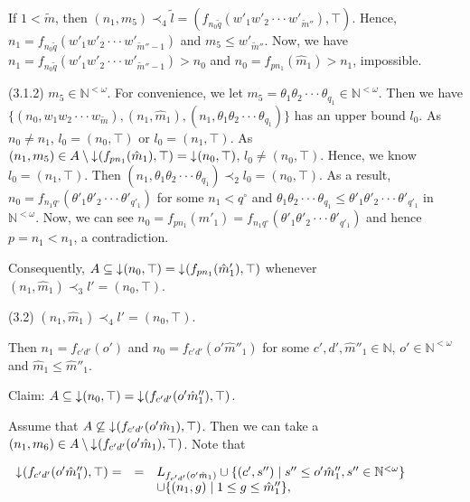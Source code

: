 \documentclass[preprint,12pt]{elsarticle}
\numberwithin{equation}{section}
\newcommand{\dn}{\mathord{\downarrow}\hspace{0.05em}}
\begin{document}
If $1<\widetilde{m}$, then $(n_{1},m_{5})\prec_{4}\widetilde{l}=(f_{n_{0}\widetilde{q}}(w'_{1}w'_{2}\cdot\cdot\cdot w'_{\widetilde{m}''}),\top)$. Hence,  $n_{1}=f_{n_{0}\widetilde{q}}(w'_{1}w'_{2}\cdot\cdot\cdot w'_{\widetilde{m}''-1})$ and $m_{5}\leq w'_{\widetilde{m}''}$. Now, we have $n_{1}=f_{n_{0}\widetilde{q}}(w'_{1}w'_{2}\cdot\cdot\cdot w'_{\widetilde{m}''-1})>n_{0}$ and $n_{0}=f_{pn_{1}}(\hat{m}_{1})>n_{1}$, impossible.




(3.1.2) $m_{5}\in \mathbb{N}^{<\omega}$. For convenience, we let $m_{5}=\theta_{1}\theta_{2}\cdot\cdot\cdot\theta_{q_{1}}\in\mathbb{N}^{<\omega}$. Then we have $\{(n_{0},w_{1}w_{2}\cdot\cdot\cdot w_{\widetilde{m}}),(n_{1},\hat{m}_{1}),(n_{1},\theta_{1}\theta_{2}\cdot\cdot\cdot\theta_{q_{1}})\}$ has an upper bound $l_{0}$. As $n_{0}\neq n_{1}$, $l_{0}=(n_{0},\top)$ or $l_{0}=(n_{1},\top)$. As $(n_{1},m_{5})\in A\setminus\dn(f_{pn_{1}}(\hat{m}_{1}),\top)=\dn(n_{0},\top)$, $l_{0}\neq(n_{0},\top)$. Hence, we know $l_{0}=(n_{1},\top)$. Then $(n_{1},\theta_{1}\theta_{2}\cdot\cdot\cdot\theta_{q_{1}})\prec_{2}l_{0}=(n_{0},\top)$. As a result, $n_{0}=f_{n_{1}q^{\circ}}(\theta'_{1}\theta'_{2}\cdot\cdot\cdot\theta'_{q'_{1}})$ for some $n_{1}<q^{\circ}$ and $\theta_{1}\theta_{2}\cdot\cdot\cdot\theta_{q_{1}}\leq\theta'_{1}\theta'_{2}\cdot\cdot\cdot\theta'_{q'_{1}}$ in $\mathbb{N}^{<\omega}$. Now, we can see $n_{0}=f_{pn_{1}}(\hat{m}'_{1})=f_{n_{1}q^{\circ}}(\theta'_{1}\theta'_{2}\cdot\cdot\cdot\theta'_{q'_{1}})$ and hence $p=n_{1}<n_{1}$, a contradiction.

Consequently, $A\subseteq \dn (n_{0},\top)=\dn(f_{pn_{1}}(\hat{m}'_{1}),\top)$ whenever $(n_{1},\hat{m}_{1})\prec_{3}l'=(n_{0},\top)$.

(3.2) $(n_{1},\hat{m}_{1})\prec_{4}l'=(n_{0},\top)$.

Then $n_{1}=f_{c'd'}(o')$ and $n_{0}=f_{c'd'}(o'\hat{m}''_{1})$ for some $c',d',\hat{m}''_{1}\in\mathbb{N}$, $o'\in\mathbb{N}^{<\omega}$ and $\hat{m}_{1}\leq\hat{m}''_{1}$.

Claim: $A\subseteq\dn (n_{0},\top)=\dn(f_{c'd'}(o'\hat{m}''_{1}),\top)$.

Assume that $A\not\subseteq\dn(f_{c'd'}(o'\hat{m}_{1}),\top)$. Then we can take a $(n_{1},m_{6})\in A\setminus\dn(f_{c'd'}(o'\hat{m}_{1}),\top)$. Note that

\setlength{\baselineskip}{1.0\baselineskip}

\begin{center}$\begin{array}{lll}
\dn(f_{c'd'}(o'\hat{m}''_{1}),\top)=&=&L_{f_{c'd'}(o'\hat{m}_{1})}\cup\{(c',s'')\mid s''\leq o'\hat{m}''_{1}, s''\in\mathbb{N}^{<\omega}\}\\
&& \cup\{(n_{1},g)\mid 1\leq g\leq \hat{m}''_{1}\},\\
\end{array}$\end{center}
\end{document}
